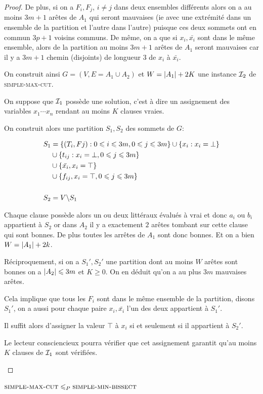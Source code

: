 \documentclass{standalone}
\begin{document}
\begin{proof}
	De plus, si on a $F_i, F_j$, $i \not= j$ dans deux ensembles différents alors on a au moins $3m+1$ arêtes de $A_1$ qui seront mauvaises (ie avec une extrémité dans un ensemble de la partition et l'autre dans l'autre) puisque ces deux sommets ont en commun $3p+1$ voisins communs. De même, on a que si $x_i, \bar{x_i}$  sont dans le même ensemble, alors de la partition au moins $3m+1$ arêtes de $A_1$ seront mauvaises car il y a $3m+1$ chemin (disjoints) de longueur 3 de $x_i$ à $\bar{x_i}$.
	
	
	On construit ainsi $G=(V, E=A_1 \cup A_2)$ et $W = \card{A_1} + 2K$ une instance $\Irond_2$ de \textsc{simple-max-cut}.
	
	On suppose que $\Irond_1$ possède une solution, c'est à dire un assignement des variables $x_1 \cdots x_n$ rendant au moins $K$ clauses vraies.
	
	On construit alors une partition $S_1, S_2$ des sommets de $G$:
	
	\begin{align*}
		S_1 &= \set{(T_i, Fj) : 0 \leq i \leq 3m, 0 \leq j \leq 3m }
		\cup \set{x_i : x_i = \bot} \\
		&\cup \set{t_{ij} : x_i = \bot, 0 \leq j \leq 3m } \\
		&\cup \set{\bar{x_i}, x_i = \top} \\
		&\cup\set{f_{ij}, x_i = \top,  0 \leq j \leq 3m} \\ \\
		S_2 &= V \backslash S_1
	\end{align*}
	
	Chaque clause possède alors un ou deux littéraux évalués à vrai et donc $a_i$ ou $b_i$ appartient à $S_2$ or dans $A_2$ il y a exactement $2$ arêtes tombant sur cette clause qui sont bonnes. De plus toutes les arrêtes de $A_1$ sont donc bonnes. Et on a bien $W = \card{A_1} + 2k$.
	
	Réciproquement, si on a $S_1', S_2'$ une partition dont au moins $W$ arêtes sont bonnes on a $\card{A_2} \leq 3m$ et $K \geq 0$. On en déduit qu'on a au plus $3m$ mauvaises arêtes.
	
	Cela implique que tous les $F_i$ sont dans le même ensemble de la partition, disons $S_1'$, on a aussi pour chaque paire $x_i, \bar{x_i}$ l'un des deux appartient à $S_1'$.
	
	Il suffit alors d'assigner la valeur $\top$ à $x_i$ si et seulement si il appartient à $S_2'$.
	
	\begin{exercice}
		Le lecteur consciencieux pourra vérifier que cet assignement garantit qu'au moins $K$ clauses de $\Irond_1$ sont vérifiées.
	\end{exercice}
\end{proof}
\begin{thm}
	$\textsc{simple-max-cut} \leq_P \textsc{simple-min-bissect}$
\end{thm}
\end{document}
